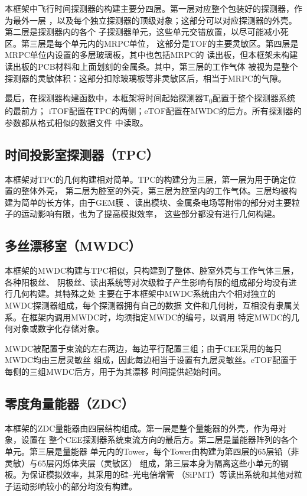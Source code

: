 \documentclass[bachelor,openany,oneside,color]{buaathesis}
\def\TZ{T\textsubscript{0}}
\begin{document}
本框架中飞行时间探测器的构建主要分四层。第一层对应整个包装好的探测器，作为最外一层
，以及每个独立探测器的顶级对象；这部分可以对应探测器的外壳。第二层是探测器内的各个
子探测器单元，这些单元交错放置，以尽可能减小死区。第三层是每个单元内的MRPC单位，
这部分是TOF的主要灵敏区。第四层是MRPC单位内设置的多层玻璃板，其中也包括MRPC的
读出板，但本框架未构建读出板的PCB材料和上面划刻的金属条。其中，第三层的工作气体
被视为是整个探测器的灵敏体积：这部分扣除玻璃板等非灵敏区后，相当于MRPC的气隙。

最后，在探测器构建函数中，本框架将时间起始探测器\TZ 配置于整个探测器系统的最前方；
iTOF配置在TPC的两侧；eTOF配置在MWDC的后方。所有探测器的参数都从格式相似的数据文件
中读取。

\subsection{时间投影室探测器（TPC）}

本框架对TPC的几何构建相对简单。TPC的构建分为三层，第一层为用于确定位置的整体外壳，
第二层为腔室的外壳，第三层为腔室内的工作气体。三层均被构建为简单的长方体，由于GEM膜
、读出模块、金属条电场等附带的部分对主要粒子的运动影响有限，也为了提高模拟效率，
这些部分都没有进行几何构建。

\subsection{多丝漂移室（MWDC）}

本框架的MWDC构建与TPC相似，只构建到了整体、腔室外壳与工作气体三层，各种阳极丝、
阴极丝、读出系统等对次级粒子产生影响有限的组成部分均没有进行几何构建。其特殊之处
主要在于本框架中MWDC系统由六个相对独立的MWDC探测器组成，每个探测器拥有自己的数据
文件和几何树，互相没有隶属关系。在框架内调用MWDC时，均须指定MWDC的编号，以调用
特定MWDC的几何对象或数字化存储对象。

MWDC被配置于束流的左右两边，每边平行配置三组；由于CEE采用的每只MWDC均由三层灵敏丝
组成，因此每边相当于设置有九层灵敏丝。eTOF配置于每侧的三组MWDC后方，用于为其漂移
时间提供起始时间。

\subsection{零度角量能器（ZDC）}

本框架的ZDC量能器由四层结构组成。第一层是整个量能器的外壳，作为母对象，设置在
整个CEE探测器系统束流方向的最后方。第二层是量能器阵列的各个单元。第三层是量能器
单元内的Tower，每个Tower由构建为第四层的65层铅（非灵敏）与65层闪烁体夹层（灵敏区）
组成，第三层本身为隔离这些小单元的钢板。为保证模拟效率，其采用的硅--光电倍增管
（SiPMT）等读出系统和其他对粒子运动影响较小的部分均没有构建。
\end{document}

